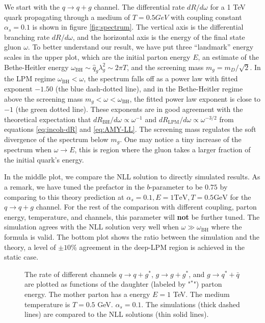We start with the $q\rightarrow q+g$ channel.
The differential rate $dR/d\omega$ for a 1 TeV quark propagating through a medium of $T=0.5 GeV$ with coupling constant $\alpha_s = 0.1$ is shown in 
figure \ref{fig:spectrum}.
The vertical axis is the differential branching rate $dR/d\omega$, and the horizontal axis is the energy of the final state gluon $\omega$.
To better understand our result, we have put three ``landmark'' energy scales in the upper plot, which are the initial parton energy $E$, an estimate of the Bethe-Heitler energy $\omega_{\textrm{BH}}\sim\hat{q}_g \lambda_g^2 \sim 2\pi T$, and the screening mass $m_g = m_D/\sqrt{2}$.
In the LPM regime $\omega_{\textrm{BH}} < \omega$, the spectrum falls off as a power law with fitted exponent $-1.50$ (the blue dash-dotted line), and in the Bethe-Heitler regime above the screening mass $m_g < \omega < \omega_{\textrm{BH}}$, the fitted power law exponent is close to $-1$ (the green dotted line).
These exponents are in good agreement with the theoretical expectation that $dR_{\textrm{BH}}/d\omega \propto \omega^{-1}$ and $dR_{\textrm{LPM}}/d\omega \propto \omega^{-3/2}$ from equations \ref{eq:incoh-dR} and \ref{eq:AMY-LL}.
The screening mass regulates the soft divergence of the spectrum below $m_g$.
One may notice a tiny increase of the spectrum when $\omega \rightarrow E$, this is region where the gluon takes a larger fraction of the initial quark's energy.

In the middle plot, we compare the NLL solution to directly simulated results.
As a remark, we have tuned the prefactor in the $b$-parameter to be $0.75$  by comparing to this theory prediction at $\alpha_s=0.1, E=1 \textrm{TeV}, T = 0.5 \textrm{GeV}$ for the $q\rightarrow q+g$ channel.
For the rest of the comparison with different coupling, parton energy, temperature, and channels, this parameter will {\bf not} be further tuned.
The simulation agrees with the NLL solution very well when $\omega \gg \omega_{\textrm{BH}}$ where the formula is valid.
The bottom plot shows the ratio between the simulation and the theory, a level of $\pm 10\%$ agreement in the deep-LPM region is achieved in the static case.

\begin{figure}
\caption{The rate of different channels $q\rightarrow q+g^*$, $g\rightarrow g+g^*$, and $g\rightarrow q^* + \bar{q}$ are plotted as functions of the daughter (labeled by "${}^*$") parton energy. The mother parton has a energy $E=1$ TeV. The medium temperature is $T=0.5$ GeV. $\alpha_s = 0.1$. The simulations (thick dashed lines) are compared to the NLL solutions (thin solid lines).}
\label{fig:channel_rate}
\end{figure}

